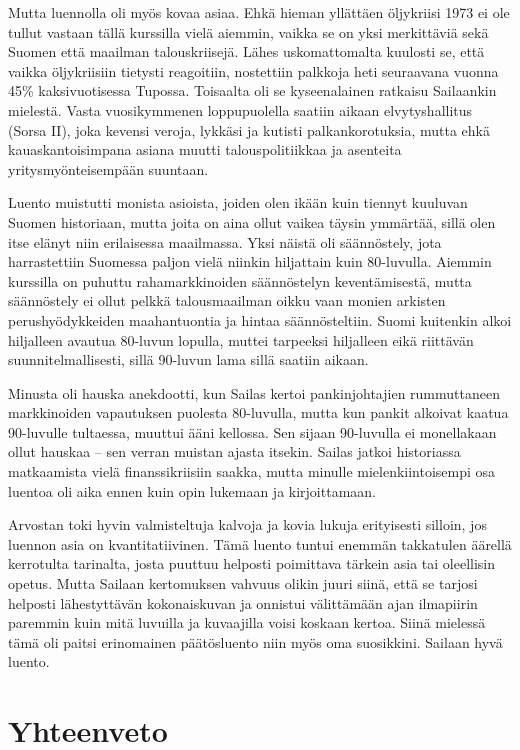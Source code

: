 \documentclass[12pt]{article}
\begin{document}
Mutta luennolla oli myös kovaa asiaa. Ehkä hieman yllättäen öljykriisi 1973 ei
ole tullut vastaan tällä kurssilla vielä aiemmin, vaikka se on yksi merkittäviä
sekä Suomen että maailman talouskriisejä. Lähes uskomattomalta kuulosti se,
että vaikka öljykriisiin tietysti reagoitiin, nostettiin palkkoja heti
seuraavana vuonna 45\% kaksivuotisessa Tupossa. Toisaalta oli se kyseenalainen
ratkaisu Sailaankin mielestä. Vasta vuosikymmenen loppupuolella saatiin aikaan
elvytyshallitus (Sorsa II), joka kevensi veroja, lykkäsi ja kutisti
palkankorotuksia, mutta ehkä kauaskantoisimpana asiana muutti talouspolitiikkaa
ja asenteita yritysmyönteisempään suuntaan.

Luento muistutti monista asioista, joiden olen ikään kuin tiennyt kuuluvan
Suomen historiaan, mutta joita on aina ollut vaikea täysin ymmärtää, sillä olen
itse elänyt niin erilaisessa maailmassa. Yksi näistä oli säännöstely, jota
harrastettiin Suomessa paljon vielä niinkin hiljattain kuin 80-luvulla. Aiemmin
kurssilla on puhuttu rahamarkkinoiden säännöstelyn keventämisestä, mutta
säännöstely ei ollut pelkkä talousmaailman oikku vaan monien arkisten
perushyödykkeiden maahantuontia ja hintaa säännösteltiin. Suomi kuitenkin alkoi
hiljalleen avautua 80-luvun lopulla, muttei tarpeeksi hiljalleen eikä riittävän
suunnitelmallisesti, sillä 90-luvun lama sillä saatiin aikaan.

Minusta oli hauska anekdootti, kun Sailas kertoi pankinjohtajien rummuttaneen
markkinoiden vapautuksen puolesta 80-luvulla, mutta kun pankit alkoivat kaatua
90-luvulle tultaessa, muuttui ääni kellossa. Sen sijaan 90-luvulla ei
monellakaan ollut hauskaa -- sen verran muistan ajasta itsekin. Sailas jatkoi
historiassa matkaamista vielä finanssikriisiin saakka, mutta minulle
mielenkiintoisempi osa luentoa oli aika ennen kuin opin lukemaan ja
kirjoittamaan.

Arvostan toki hyvin valmisteltuja kalvoja ja kovia lukuja erityisesti silloin,
jos luennon asia on kvantitatiivinen. Tämä luento tuntui enemmän takkatulen
äärellä kerrotulta tarinalta, josta puuttuu helposti poimittava tärkein asia
tai oleellisin opetus. Mutta Sailaan kertomuksen vahvuus olikin juuri siinä,
että se tarjosi helposti lähestyttävän kokonaiskuvan ja onnistui välittämään
ajan ilmapiirin paremmin kuin mitä luvuilla ja kuvaajilla voisi koskaan kertoa.
Siinä mielessä tämä oli paitsi erinomainen päätösluento niin myös oma
suosikkini. Sailaan hyvä luento.


\newpage
\section{Yhteenveto}
\end{document}
